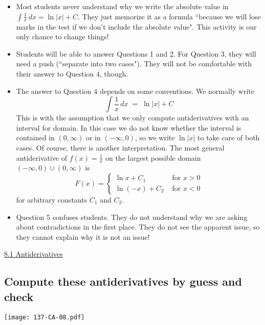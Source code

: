 \documentclass[11pt]{article}
\newcommand {\DS} [1] {${\displaystyle #1}$}
\newcommand{\nl}{\hfill \vspace{-1.1\baselineskip}} %
\newcommand{\vi}{\hspace{8mm} \href{https://www.youtube.com/watch?v=xcyL3sEL2mM&list=PLlwePzQY_wW_8-sITAbG_GU2JgiuwXkDN&index=1}{8.1 Antiderivatives}}
\begin{document}
\begin{comments}
\nl
	\begin{itemize}
		\item Most students never understand why we write the absolute value in \DS{\int \frac 1x \,dx = \ln |x|+C}.  They just memorize it as a formula ``because we will lose marks in the test if we don't include the absolute value".  This activity is our only chance to change things!
		\item   Students will be able to answer Questions 1 and 2.   For Question 3, they will need a push (``separate into two cases").  They will not be comfortable with their answer to Question 4, though.
		\item The answer to Question 4 depends on some conventions.  We normally write
			$$
				\int \frac 1x \, dx \; = \; \ln|x| + C
			$$
			This is with the assumption that we only compute antiderivatives with an interval for domain.  In this case we do not know whether the interval is contained in $(0,\infty)$ or in $(-\infty,0)$, so we write \DS{\ln |x|} to take care of both cases.  Of course, there is another interpretation.  The most general antiderivative of \DS{f(x) = \frac{1}{x}} on the largest possible domain $(-\infty,0) \cup (0,\infty)$ is
			$$
				F(x) = \begin{cases} \ln x + C_1 & \mbox{ for } x >0 \\ \ln(-x) + C_2 & \mbox{ for } x<0 \end{cases}
			$$
			for arbitrary constants $C_1$ and $C_2$.
		\item Question 5 confuses students.  They do not understand why we are asking about contradictions in the first place.  They do not see the apparent issue, so they cannot explain why it is not an issue!
	\end{itemize}
\end{comments}

\begin{videos}
\vi
\end{videos}

\newpage
\subsection{Compute these antiderivatives by guess and check}

\begin{center}
{ \texttt{[image: 137-CA-08.pdf]}} 
\end{center}
\end{document}
